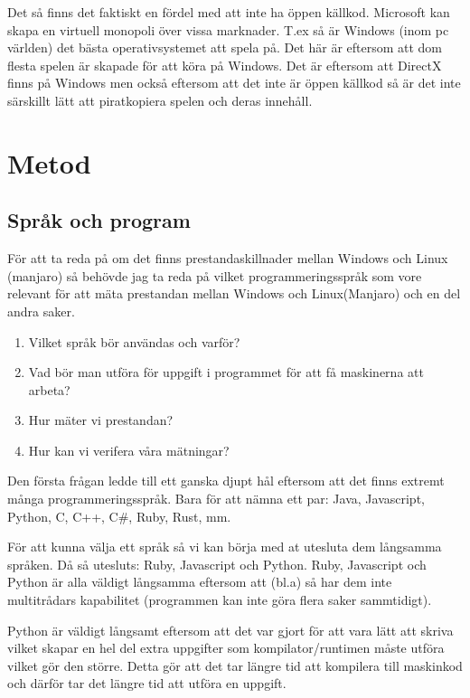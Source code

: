 \documentclass[12pt, a4paper]{report}
\begin{document}
   Det så finns det faktiskt en fördel med att inte ha öppen källkod. Microsoft kan skapa en virtuell monopoli över vissa marknader. T.ex så är Windows (inom pc världen) det bästa operativsystemet att spela på. Det här är eftersom att dom flesta spelen är skapade för att köra på Windows. Det är eftersom att DirectX\cite{directx} finns på Windows men också eftersom att det inte är öppen källkod så är det inte särskillt lätt att piratkopiera spelen och deras innehåll.


 
\section{Metod}
 

\subsection{Språk och program}
 
För att ta reda på om det finns prestandaskillnader mellan Windows och Linux (manjaro) så behövde jag ta reda på vilket programmeringsspråk som vore relevant för att mäta prestandan mellan Windows och Linux(Manjaro) och en del andra saker.

\begin{enumerate}
   \item Vilket språk bör användas och varför?
   \item Vad bör man utföra för uppgift i programmet för att få maskinerna att arbeta?
   \item Hur mäter vi prestandan?
   \item Hur kan vi verifera våra mätningar?
\end{enumerate}
 
Den första frågan ledde till ett ganska djupt hål eftersom att det finns extremt många programmeringsspråk. Bara för att nämna ett par: Java, Javascript, Python, C, C++, C\#, Ruby, Rust, mm. 


För att kunna välja ett språk så vi kan börja med at utesluta dem långsamma språken. Då så utesluts: Ruby, Javascript och Python. Ruby, Javascript och Python är alla väldigt långsamma eftersom att (bl.a) så har dem inte multitrådars kapabilitet (programmen kan inte göra flera saker sammtidigt).

 Python är väldigt långsamt eftersom att det var gjort för att vara lätt att skriva vilket skapar en hel del extra uppgifter som kompilator/runtimen måste utföra vilket gör den större. Detta gör att det tar längre tid att kompilera till maskinkod och därför tar det längre tid att utföra en uppgift. 
 
\end{document}
